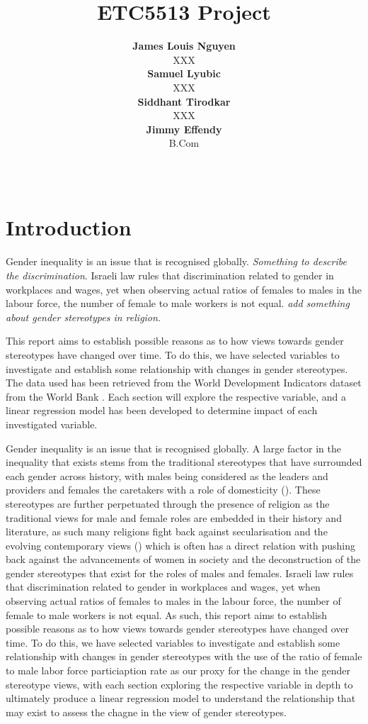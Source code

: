 \documentclass[11pt,a4paper,]{article}
\title{ETC5513 Project}
\author{\sf\Large\textbf{ James Louis Nguyen}\\ {\sf\large XXX\\[0.5cm]} \sf\Large\textbf{ Samuel Lyubic}\\ {\sf\large XXX\\[0.5cm]} \sf\Large\textbf{ Siddhant Tirodkar}\\ {\sf\large XXX\\[0.5cm]} \sf\Large\textbf{ Jimmy Effendy}\\ {\sf\large B.Com\\[0.5cm]}}
\date{\sf\Date~\Month~\Year}
\makeatletter
\def\titlepage{\front{\expandafter{\@title}}{\@author}{\@organization}}
\makeatother
\begin{document}
\titlepage

\section*{Introduction}

Gender inequality is an issue that is recognised globally. \emph{Something to describe the discrimination}. Israeli law rules that discrimination related to gender in workplaces and wages, yet when observing actual ratios of females to males in the labour force, the number of female to male workers is not equal. \emph{add something about gender stereotypes in religion}.

This report aims to establish possible reasons as to how views towards gender stereotypes have changed over time. To do this, we have selected variables to investigate and establish some relationship with changes in gender stereotypes. The data used has been retrieved from the World Development Indicators dataset from the World Bank \textcite{TheWorldBank2020}. Each section will explore the respective variable, and a linear regression model has been developed to determine impact of each investigated variable.

Gender inequality is an issue that is recognised globally. A large factor in the inequality that exists stems from the traditional stereotypes that have surrounded each gender across history, with males being considered as the leaders and providers and females the caretakers with a role of domesticity (\textcite{Woodhead}). These stereotypes are further perpetuated through the presence of religion as the traditional views for male and female roles are embedded in their history and literature, as such many religions fight back against secularisation and the evolving contemporary views (\textcite{VoicuM2009}) which is often has a direct relation with pushing back against the advancements of women in society and the deconstruction of the gender stereotypes that exist for the roles of males and females. Israeli law rules that discrimination related to gender in workplaces and wages, yet when observing actual ratios of females to males in the labour force, the number of female to male workers is not equal. As such, this report aims to establish possible reasons as to how views towards gender stereotypes have changed over time. To do this, we have selected variables to investigate and establish some relationship with changes in gender stereotypes with the use of the ratio of female to male labor force particiaption rate as our proxy for the change in the gender stereotype views, with each section exploring the respective variable in depth to ultimately produce a linear regression model to understand the relationship that may exist to assess the chagne in the view of gender stereotypes.
\end{document}
